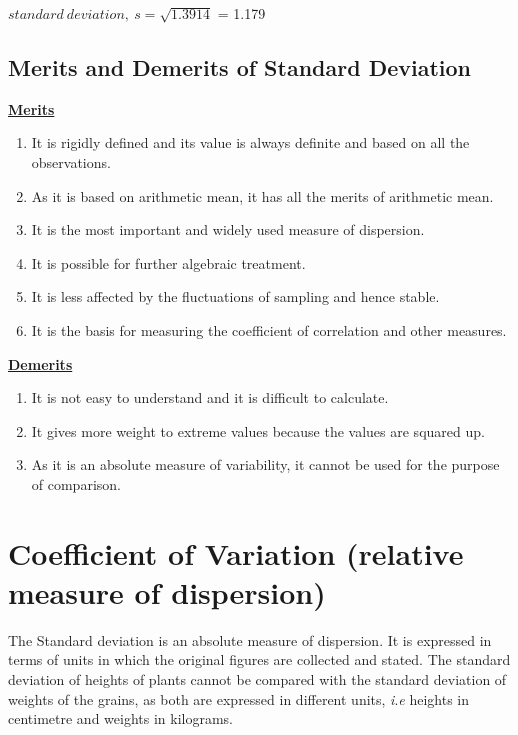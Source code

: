 \documentclass[
]{book}
\begin{document}
\(standard\ deviation,\ s = \sqrt{1.3914}\) = 1.179

\hypertarget{merits-and-demerits-of-standard-deviation}{%
\subsection{Merits and Demerits of Standard Deviation}\label{merits-and-demerits-of-standard-deviation}}

\ul{\textbf{Merits}}

\begin{enumerate}
\def\labelenumi{\arabic{enumi}.}
\item
  It is rigidly defined and its value is always definite and based on
  all the observations.
\item
  As it is based on arithmetic mean, it has all the merits of
  arithmetic mean.
\item
  It is the most important and widely used measure of dispersion.
\item
  It is possible for further algebraic treatment.
\item
  It is less affected by the fluctuations of sampling and hence
  stable.
\item
  It is the basis for measuring the coefficient of correlation and
  other measures.
\end{enumerate}

\ul{\textbf{Demerits}}

\begin{enumerate}
\def\labelenumi{\arabic{enumi}.}
\item
  It is not easy to understand and it is difficult to calculate.
\item
  It gives more weight to extreme values because the values are
  squared up.
\item
  As it is an absolute measure of variability, it cannot be used for
  the purpose of comparison.
\end{enumerate}

\hypertarget{coefficient-of-variation-relative-measure-of-dispersion}{%
\section{Coefficient of Variation (relative measure of dispersion)}\label{coefficient-of-variation-relative-measure-of-dispersion}}

The Standard deviation is an absolute measure of dispersion. It is
expressed in terms of units in which the original figures are collected
and stated. The standard deviation of heights of plants cannot be
compared with the standard deviation of weights of the grains, as both
are expressed in different units, \emph{i}.\emph{e} heights in centimetre and
weights in kilograms.
\end{document}
